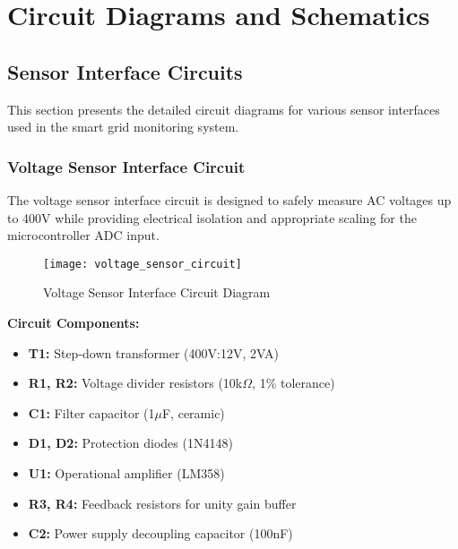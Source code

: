 
\chapter{Circuit Diagrams and Schematics}
\label{chap:circuits}

\section{Sensor Interface Circuits}
\label{sec:sensor_circuits}

This section presents the detailed circuit diagrams for various sensor interfaces used in the smart grid monitoring system.

\subsection{Voltage Sensor Interface Circuit}
\label{subsec:voltage_sensor_circuit}

The voltage sensor interface circuit is designed to safely measure AC voltages up to 400V while providing electrical isolation and appropriate scaling for the microcontroller ADC input.

\begin{figure}[H]
\centering
\texttt{[image: voltage\_sensor\_circuit]}
\caption{Voltage Sensor Interface Circuit Diagram}
\label{fig:voltage_sensor_circuit}
\end{figure}

\textbf{Circuit Components:}
\begin{itemize}
\item \textbf{T1:} Step-down transformer (400V:12V, 2VA)
\item \textbf{R1, R2:} Voltage divider resistors (10k$\Omega$, 1\% tolerance)
\item \textbf{C1:} Filter capacitor (1$\mu$F, ceramic)
\item \textbf{D1, D2:} Protection diodes (1N4148)
\item \textbf{U1:} Operational amplifier (LM358)
\item \textbf{R3, R4:} Feedback resistors for unity gain buffer
\item \textbf{C2:} Power supply decoupling capacitor (100nF)
\end{itemize}


